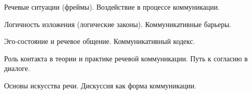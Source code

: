 \documentclass[
	14pt,
	a4paper,
	]
	{scrartcl}
\begin{document}
\vfill

\newpage


\shapk
{}
\setcounter{zad}{0}

\vfill
\z Речевые ситуации (фреймы).
 \vfill
\z Воздействие в процессе коммуникации.
 \vfill

\vfill

\newpage


\shapk
{}
\setcounter{zad}{0}

\vfill
\z Логичность изложения (логические законы).
 \vfill
\z Коммуникативные барьеры.
 \vfill

\vfill

\newpage


\shapk
{}
\setcounter{zad}{0}

\vfill
\z Эго-состояние и речевое общение.
 \vfill
\z Коммуникативный кодекс.
 \vfill

\vfill

\newpage


\shapk
{}
\setcounter{zad}{0}

\vfill
\z Роль контакта в теории и практике речевой коммуникации.
 \vfill
\z Путь к согласию в диалоге.
 \vfill

\vfill

\newpage


\shapk
{}
\setcounter{zad}{0}

\vfill
\z Основы искусства речи.
 \vfill
\z Дискуссия как форма коммуникации.
 \vfill

\vfill

\newpage
\end{document}
